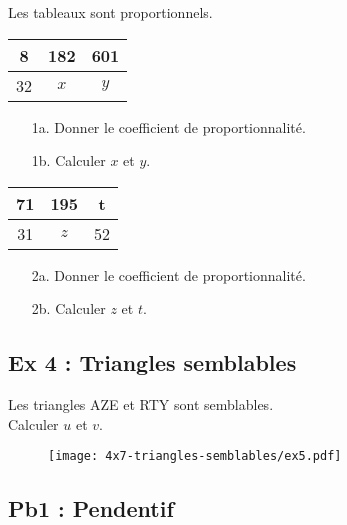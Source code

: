 Les tableaux sont proportionnels. 

\begin{multicols}{2}
\begin{center}
  \begin{tabular}{|c|c|c|}
    \hline
    8 & 182 & 601 \\  \hline
    32 & $x$ & $y$\\  \hline
  \end{tabular}
\end{center}

\begin{enumerate}
  \item[1a.] Donner le coefficient de proportionnalité.
  \item[1b.] Calculer $x$ et $y$.
  \end{enumerate}

\begin{center}
  \begin{tabular}{|c|c|c|}
    \hline
    71 & 195 & t \\  \hline
    31 & $z$ & 52\\  \hline
  \end{tabular}
\end{center}

\begin{enumerate}
  \item[2a.] Donner le coefficient de proportionnalité.
  \item[2b.] Calculer $z$ et $t$.
  \end{enumerate}
\end{multicols}

\Pointilles[8]

\newpage

\begin{multicols}{2}
\subsection*{Ex 4 : Triangles semblables}

Les triangles AZE et RTY sont semblables.\\ Calculer $u$ et $v$. 

\begin{figure}[H]
  \centering
  \texttt{[image: 4x7-triangles-semblables/ex5.pdf]}
\end{figure}
\end{multicols} 

\Pointilles[5]

\subsection*{Pb1 : Pendentif} 

